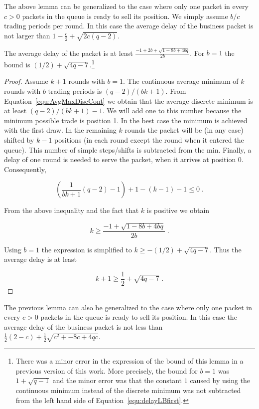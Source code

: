 \documentclass[letterpaper,10pt]{llncs}
\newcommand{\hlb}[1]{\hl{#1}}
\renewcommand{\hlb}[1]{#1}
\begin{document}
The above lemma can be generalized to the case where only one packet in every $c > 0$ packets in the queue is ready to sell its position. We simply assume $b/c$ trading periods per round. 
In this case the average delay of the business packet is not larger 
than $1-\frac{c}{2}+\sqrt{2 c (q-2)}$.


\begin{lemma}
\label{lem:delayLB}
The average delay of the packet is at least $\frac{-1+2b+\sqrt{1-8 b+4 b q}}{2 b}$.
For $b=1$ the bound is $(1/2) +\sqrt{4q - 7}$.\footnote{\hlb{There was a minor error 
in the expression of the bound of this lemma in a previous version of this work. More precisely,
the bound for $b=1$ was $1 +\sqrt{q - 1}$ and the minor error was that the constant $1$ caused by 
using the continuous minimum instead of the discrete minimum was not subtracted from the left hand side 
of Equation}~\ref{equ:delayLBfirst}.}
\end{lemma}

\begin{proof}
Assume $k+1$ rounds with $b=1$. 
The continuous average minimum of $k$ rounds with $b$ trading periods is $(q-2)/(bk+1)$.
From Equation~\ref{equ:AvgMaxDiscCont} we obtain that the average discrete minimum is at 
least $(q-2)/(bk+1) - 1$. 
We will add one to this number because the minimum possible trade is position 1.
In the best case the minimum is achieved with the first draw. In the remaining $k$ rounds the packet will be (in any case) shifted by $k-1$ positions (in each round except the round when it entered the queue).
This number of simple steps/shifts is subtracted from the min. 
Finally, a delay of one round is needed to serve the packet, when it arrives at position 0.
Consequently,


\begin{equation}
\label{equ:delayLBfirst}
\left(\frac{1}{bk+1} (q-2) - 1 \right) + 1 - (k-1) - 1 \leq 0 \; .
\end{equation}

\noindent
From the above inequality and the fact that $k$ is positive we obtain 

\[
k \geq \frac{-1+\sqrt{1-8 b+4 b q}}{2 b} \; .
\]

\noindent
Using $b=1$ the expression is simplified to 
$k \geq -(1/2) + \sqrt{4q-7}$. Thus the average delay is at least

\[
k + 1 \geq \frac{1}{2} + \sqrt{4q-7} \; .
\]
\end{proof}

The previous lemma can also be generalized to the case where only one packet in every $c > 0$ packets in the queue is ready to sell its position. In this case the average delay of the business packet is not less than $\frac{1}{2}(2-c)+\frac{1}{2} \sqrt{c^2+ - 8 c + 4 q c}$.
\end{document}
